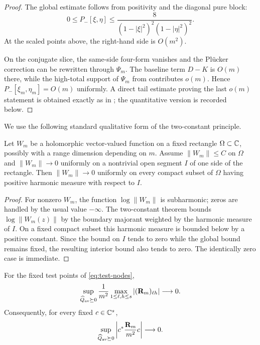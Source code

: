 \begin{proof}
The global estimate follows from positivity and the diagonal pure
block:
\[
 0\le P_-[\xi,\eta]
 \le
 \frac{8}{(1-|\xi|^2)^2(1-|\eta|^2)^2}.
\]
At the scaled points above, the right-hand side is $O(m^2)$.

On the conjugate slice, the same-side four-form vanishes and the
Pl\"ucker correction can be rewritten through $\Psi_m$.  The baseline
term $D-K$ is $O(m)$ there, while the high-total support of $\Psi_m$
from  contributes $o(m)$.  Hence
$P_-[\xi_m,\eta_m]=O(m)$ uniformly.  A direct tail estimate proving the last $o(m)$ statement is obtained exactly as in ; the quantitative version is recorded below.
\end{proof}

We use the following standard qualitative form of the two-constant
principle.

\begin{lemma}\label{B:lem:continuation}
Let $W_m$ be a holomorphic vector-valued function on a fixed rectangle
$\Omega\subset\mathbb{C}$, possibly with a range dimension depending on $m$.
Assume $\|W_m\|\le C$ on $\Omega$ and
$\|W_m\|\to0$ uniformly on a nontrivial open segment $I$ of one side
of the rectangle.  Then $\|W_m\|\to0$ uniformly on every compact subset
of $\Omega$ having positive harmonic measure with respect to $I$.
\end{lemma}

\begin{proof}
For nonzero $W_m$, the function $\log\|W_m\|$ is subharmonic; zeros are
handled by the usual value $-\infty$.  The two-constant theorem bounds
$\log\|W_m(z)\|$ by the boundary majorant weighted by the harmonic
measure of $I$.  On a fixed compact subset this harmonic measure is
bounded below by a positive constant.  Since the bound on $I$ tends to
zero while the global bound remains fixed, the resulting interior bound
also tends to zero.  The identically zero case is immediate.
\end{proof}

\begin{proposition}
\label{B:prop:R}
For the fixed test points of \eqref{eq:test-nodes},
\begin{equation}\label{B:eq:Rvanish}
 \sup_{\widehat Q_{\rm av}\succeq0}
 \frac1{m^2}\max_{1\le\ell,h\le s}
 |(\mathbf R_m)_{\ell h}|
 \longrightarrow0.
\end{equation}
Consequently, for every fixed $c\in\mathbb{C}^s$,
\[
 \sup_{\widehat Q_{\rm av}\succeq0}
 \left|
 c^*\frac{\mathbf R_m}{m^2}c
 \right|
 \longrightarrow0.
\]
\end{proposition}

